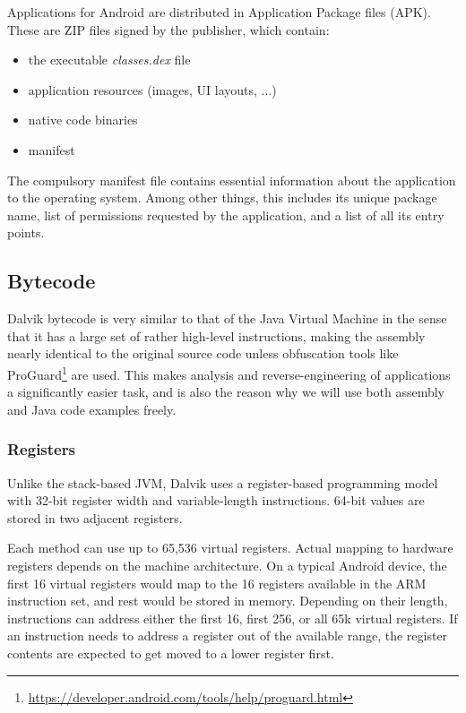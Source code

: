 \documentclass[12pt,twoside,notitlepage]{report}
\begin{document}
Applications for Android are distributed in Application Package files (APK). These are ZIP files signed by the publisher, which contain:
\begin{itemize}
\item the executable \emph{classes.dex} file
\item application resources (images, UI layouts, ...)
\item native code binaries
\item manifest
\end{itemize}

The compulsory manifest file contains essential information about the application to the operating system. Among other things, this includes its unique package name, list of permissions requested by the application, and a list of all its entry points.

\subsection{Bytecode}

Dalvik bytecode is very similar to that of the Java Virtual Machine in the sense that it has a large set of rather high-level instructions, making the assembly nearly identical to the original source code unless obfuscation tools like ProGuard\footnote{\url{https://developer.android.com/tools/help/proguard.html}} are used. This makes analysis and reverse-engineering of applications a significantly easier task, and is also the reason why we will use both assembly and Java code examples freely.

\subsubsection{Registers}

Unlike the stack-based JVM, Dalvik uses a register-based programming model with 32-bit register width and variable-length instructions. 64-bit values are stored in two adjacent registers.

Each method can use up to 65,536 virtual registers. Actual mapping to hardware registers depends on the machine architecture. On a typical Android device, the first 16 virtual registers would map to the 16 registers available in the ARM instruction set, and rest would be stored in memory. Depending on their length, instructions can address either the first 16, first 256, or all 65k virtual registers. If an instruction needs to address a register out of the available range, the register contents are expected to get moved to a lower register first.
\end{document}

